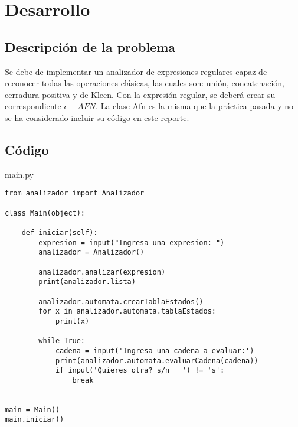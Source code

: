 \section{Desarrollo}

\subsection{Descripción de la problema}

Se debe de implementar un analizador de expresiones regulares capaz de reconocer todas las operaciones clásicas, las cuales son: unión, concatenación, cerradura positiva y de Kleen. Con la expresión regular, se deberá crear su correspondiente $\epsilon - AFN$. La clase Afn es la misma que la práctica pasada y no se ha considerado incluir su código en este reporte.

\subsection{Código}

main.py
\lstset{language=Python, breaklines=true, basicstyle=\footnotesize}
\begin{lstlisting}[frame=single]
from analizador import Analizador

class Main(object):

    def iniciar(self):
        expresion = input("Ingresa una expresion: ")
        analizador = Analizador()

        analizador.analizar(expresion)
        print(analizador.lista)

        analizador.automata.crearTablaEstados()
        for x in analizador.automata.tablaEstados:
            print(x)

        while True:
            cadena = input('Ingresa una cadena a evaluar:')
            print(analizador.automata.evaluarCadena(cadena))
            if input('Quieres otra? s/n   ') != 's':
                break


main = Main()
main.iniciar()
\end{lstlisting}


